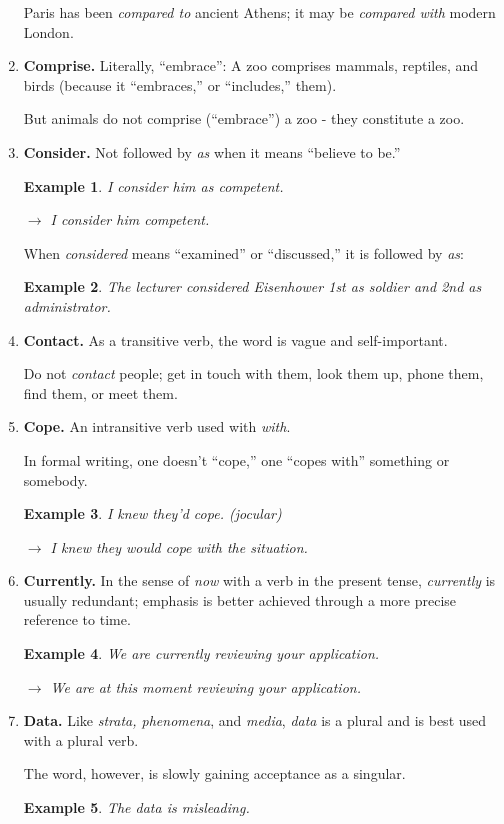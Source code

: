 \documentclass{article}
\newtheorem{example}{Example}
\begin{document}
\begin{enumerate}
	Paris has been {\it compared to} ancient Athens; it may be {\it compared with} modern London.
	\item {\bf Comprise.} Literally, ``embrace'': A zoo comprises mammals, reptiles, and birds (because it ``embraces,'' or ``includes,'' them).
	
	But animals do not comprise (``embrace'') a zoo - they constitute a zoo.
	\item {\bf Consider.} Not followed by {\it as} when it means ``believe to be.''
	\begin{example}
		I consider him as competent.
		
		$\to$ I consider him competent.
	\end{example}
	When {\it considered} means ``examined'' or ``discussed,'' it is followed by {\it as}:
	\begin{example}
		The lecturer considered Eisenhower 1st as soldier and 2nd as administrator.
	\end{example}
	\item {\bf Contact.} As a transitive verb, the word is vague and self-important.
	
	Do not {\it contact} people; get in touch with them, look them up, phone them, find them, or meet them.
	\item {\bf Cope.} An intransitive verb used with {\it with}.
	
	In formal writing, one doesn't ``cope,'' one ``copes with'' something or somebody.
	\begin{example}
		I knew they'd cope. (jocular)
		
		$\to$ I knew they would cope with the situation.
	\end{example}
	\item {\bf Currently.} In the sense of {\it now} with a verb in the present tense, {\it currently} is usually redundant; emphasis is better achieved through a more precise reference to time.
	\begin{example}
		We are currently reviewing your application.
		
		$\to$ We are at this moment reviewing your application.
	\end{example}
	\item {\bf Data.} Like {\it strata, phenomena}, and {\it media}, {\it data} is a plural and is best used with a plural verb.
	
	The word, however, is slowly gaining acceptance as a singular.
	\begin{example}
		The data is misleading.
		

\end{example}
\end{enumerate}
\end{document}
